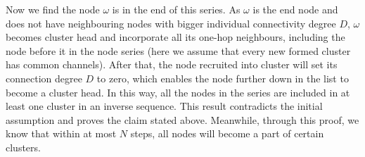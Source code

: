 \documentclass[10pt,journal,compsoc]{IEEEtran}
\makeatletter
\theoremstyle{mytheoremstyle}
\theoremstyle{mytheoremstyle}
\theoremstyle{mytheoremstyle}
\renewenvironment{proof}[1][\proofname]{%
      \par\pushQED{\qed}\fontfamily{ptm}\selectfont%
      \topsep6\p@\@plus6\p@\relax
      \trivlist\item[\hskip\labelsep\bfseries#1\@addpunct{.}]%
      \ignorespaces
    }{%
      \popQED\endtrivlist\@endpefalse
    }
\makeatother
\begin{document}
\begin{proof}
Now we find the node $\omega$ is in the end of this series.
As $\omega$ is the end node and does not have neighbouring nodes with bigger individual connectivity degree $D$, $\omega$ becomes cluster head and incorporate all its one-hop neighbours, including the node before it in the node series (here we assume that every new formed cluster has common channels).
After that, the node recruited into cluster will set its connection degree $D$ to zero, which enables the node further down in the list to become a cluster head.
In this way, all the nodes in the series are included in at least one cluster in an inverse sequence.
This result contradicts the initial assumption and proves the claim stated above.
Meanwhile, through this proof, we know that within at most $N$ steps, all nodes will become a part of certain clusters.
\end{proof}


%
\end{document}
